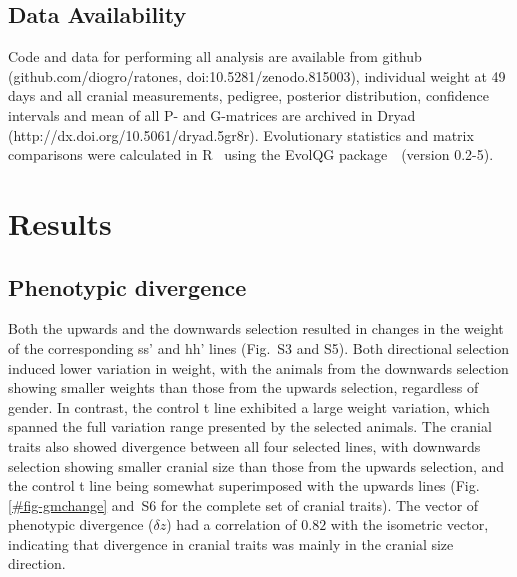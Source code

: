 \begin{refsection}
\subsection{Data Availability}

Code and data for performing all analysis are available from github
(github.com/diogro/ratones, doi:10.5281/zenodo.815003), individual
weight at 49 days and all cranial measurements, pedigree, posterior
distribution, confidence intervals and mean of all P- and G-matrices are
archived in Dryad (http://dx.doi.org/10.5061/dryad.5gr8r). Evolutionary
statistics and matrix comparisons were calculated in R~\parencite{R2005}
using the EvolQG package~\parencite{Melo2015-kf}~(version 0.2-5).

\section{Results}

\subsection{Phenotypic divergence}

Both the upwards and the downwards selection resulted in changes
in the weight of the corresponding s\textbar{}s' and h\textbar{}h' lines
(Fig.~S3 and S5). Both directional selection induced lower variation in
weight, with the animals from the downwards selection showing smaller
weights than those from the upwards selection, regardless of gender. In
contrast, the control t line exhibited a large weight variation, which
spanned the full variation range presented by the selected animals. The
cranial traits also showed divergence between all four selected lines,
with downwards selection showing smaller cranial size than those from
the upwards selection, and the control t line being somewhat
superimposed with the upwards lines (Fig. \ref{#fig-gmchange} and~S6
for the complete set of cranial traits). The vector of phenotypic
divergence (\(\delta z\)) had a correlation of \(0.82\) with the
isometric vector, indicating that divergence in cranial traits was
mainly in the cranial size direction.


\end{refsection}
